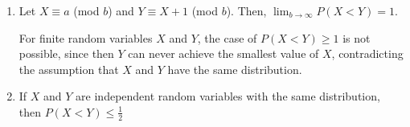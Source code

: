 \begin{enumerate}[label=(\alph*)]
\item Let $X \equiv a$ (mod $b$) and $Y \equiv X + 1$ (mod $b$). Then, $\lim_{b
\to \infty} P(X < Y) = 1$.

For finite random variables $X$ and $Y$, the case of $P(X < Y) \geq 1$ is not 
possible, since then $Y$ can never achieve the smallest value of $X$,
contradicting the assumption that $X$ and $Y$ have the same distribution.

\item If $X$ and $Y$ are independent random variables with the same
distribution, then $P(X < Y) \leq \frac{1}{2}$
\end{enumerate}